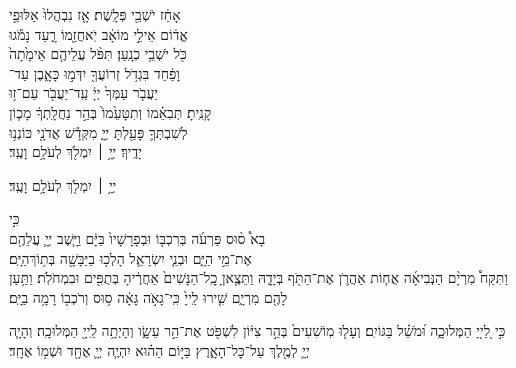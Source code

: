 אָחַ֔ז יֹשְׁבֵ֖י פְּלָֽשֶׁת׃ \hfill אָ֤ז נִבְהֲלוּ֙ אַלּוּפֵ֣י \\
אֱד֔וֹם \hfill אֵילֵ֣י מוֹאָ֔ב יֹֽאחֲזֵ֖מוֹ רָ֑עַד \hfill נָמֹ֕גוּ \\
כֹּ֖ל יֹשְׁבֵ֥י כְנָֽעַן׃ \hfill תִּפֹּ֨ל עֲלֵיהֶ֤ם אֵימָ֙תָה֙ \\
וָפַ֔חַד \hfill בִּגְדֹ֥ל זְרוֹעֲךָ֖ יִדְּמ֣וּ כָּאָ֑בֶן \hfill עַד־\\
יַעֲבֹ֤ר עַמְּךָ֙ יְיָ֔ \hfill עַֽד־יַעֲבֹ֖ר עַם־ז֥וּ \\
קָנִֽיתָ׃ \hfill תְּבִאֵ֗מוֹ וְתִטָּעֵ֙מוֹ֙ בְּהַ֣ר נַחֲלָֽתְךָ֔ \hfill מָכ֧וֹן \\
לְשִׁבְתְּךָ֛ פָּעַ֖לְתָּ יְיָ֑ \hfill מִקְּדָ֕שׁ אֲדֹנָ֖י כּוֹנְנ֥וּ \\
יָדֶֽיךָ׃ \hfill יְיָ֥ ׀ יִמְלֹ֖ךְ לְעֹלָ֥ם וָעֶֽד׃ \begin{footnotesize}יְיָ֥ ׀ יִמְלֹ֖ךְ לְעֹלָ֥ם וָעֶֽד׃\end{footnotesize}
\hfill \begin{small} כִּ֣י \\
	בָא֩ ס֨וּס פַּרְעֹ֜ה בְּרִכְבּ֤וֹ וּבְפָרָשָׁיו֙ בַּיָּ֔ם \hfill וַיָּ֧שֶׁב יְיָ֛ עֲלֵהֶ֖ם \\
	אֶת־מֵ֣י הַיָּ֑ם \hfill וּבְנֵ֧י יִשְׂרָאֵ֛ל הָלְכ֥וּ בַיַּבָּשָׁ֖ה בְּת֥וֹךְ\hfill הַיָּֽם׃\\
	וַתִּקַּח֩ מִרְיָ֨ם הַנְּבִיאָ֜ה אֲח֧וֹת אַהֲרֹ֛ן אֶת־הַתֹּ֖ף בְּיָדָ֑הּ וַתֵּצֶ֤אןָ כׇֽל־הַנָּשִׁים֙ אַחֲרֶ֔יהָ בְּתֻפִּ֖ים וּבִמְחֹלֹֽת׃ וַתַּ֥עַן לָהֶ֖ם מִרְיָ֑ם שִׁ֤ירוּ לַֽייָ֙ כִּֽי־גָאֹ֣ה גָּאָ֔ה ס֥וּס וְרֹכְב֖וֹ רָמָ֥ה בַיָּֽם׃\hfill\break 
\end{small}
כִּ֣י לַ֭ייָ֭ הַמְּלוּכָ֑ה וּ֝מֹשֵׁ֗ל בַּגּוֹיִֽם׃
וְעָל֤וּ מֽוֹשִׁעִים֙ בְּהַ֣ר צִיּ֔וֹן לִשְׁפֹּ֖ט אֶת־הַ֣ר עֵשָׂ֑ו וְהָיְתָ֥ה לַֽייָ֖ הַמְּלוּכָֽה׃
וְהָיָ֧ה יְיָ֛ לְמֶ֖לֶךְ עַל־כׇּל־הָאָ֑רֶץ בַּיּ֣וֹם הַה֗וּא יִהְיֶ֧ה יְיָ֛ אֶחָ֖ד וּשְׁמ֥וֹ אֶחָֽד׃

 {\yishtabach
		
		\mimaamakim
		
		\halfkaddish
		
		\enlargethispage{\baselineskip}
		
		\vspace{1.25\baselineskip}}{}

